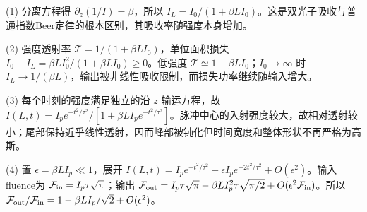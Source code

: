 (1) 分离方程得 \(\partial_z(1/I)=\beta\)，所以 \(\boxed{I_L=I_0/(1+\beta LI_0)}\)。这是双光子吸收与普通指数Beer定律的根本区别，其吸收率随强度本身增加。

(2) 强度透射率 \(\mathcal T=1/(1+\beta LI_0)\)，单位面积损失 \(I_0-I_L=\beta LI_0^2/(1+\beta LI_0)\ge0\)。低强度 \(\mathcal T\simeq1-\beta LI_0\)；\(I_0\to\infty\) 时 \(I_L\to1/(\beta L)\)，输出被非线性吸收限制，而损失功率继续随输入增大。

(3) 每个时刻的强度满足独立的沿 \(z\) 输运方程，故 \(\boxed{I(L,t)=I_pe^{-t^2/\tau^2}/[1+\beta LI_pe^{-t^2/\tau^2}]}\)。脉冲中心的入射强度较大，故相对透射较小；尾部保持近乎线性透射，因而峰部被钝化但时间宽度和整体形状不再严格为高斯。

(4) 置 \(\epsilon=\beta LI_p\ll1\)，展开 \(I(L,t)=I_pe^{-t^2/\tau^2}-\epsilon I_pe^{-2t^2/\tau^2}+O(\epsilon^2)\)。输入fluence为 \(\mathcal F_{\rm in}=I_p\tau\sqrt\pi\)；输出 \(\mathcal F_{\rm out}=I_p\tau\sqrt\pi-\beta LI_p^2\tau\sqrt{\pi/2}+O(\epsilon^2\mathcal F_{\rm in})\)。所以 \(\mathcal F_{\rm out}/\mathcal F_{\rm in}=1-\beta LI_p/\sqrt2+O(\epsilon^2)\)。
